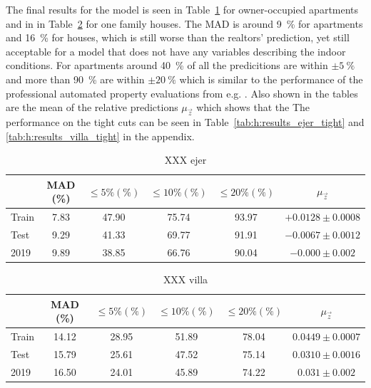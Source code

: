 The final results for the model is seen in Table~\ref{tab:h:results_ejer} for owner-occupied apartments and in in Table~\ref{tab:h:results_villa} for one family houses. The MAD is around \SI{9}{\percent} for apartments and \SI{16}{\percent} for houses, which is still worse than the realtors' prediction, yet still acceptable for a model that does not have any variables describing the indoor conditions. For apartments around \SI{40}{\percent} of all the predicitions are within $\pm \SI{5}{\percent}$ and more than \SI{90}{\percent} are within $\pm \SI{20}{\percent}$ which is similar to the performance of the professional automated property evaluations from e.g. \citet{bolighedBolighedUsikkerhedDatavurderingen}. Also shown in the tables are the mean of the relative predictions $\mu_{\vec{z}}$ which shows that the  The performance on the tight cuts can be seen in Table~\ref{tab:h:results_ejer_tight} and \ref{tab:h:results_villa_tight} in the appendix. 


\begin{table}
  \centerfloat
  \begin{tabular}{@{}lccccc@{}}
    {} &      MAD (\%) & $\leq 5\% (\%)$ &  $\leq 10\% (\%)$ &   $\leq 20\% (\%)$ & $\mu_\vec{z}$              \\
    \midrule
    Train & \num{7.83} & \num{47.90} & \num{75.74} & \num{93.97} &   $+0.0128 \pm 0.0008$ \\
    Test  & \num{9.29} & \num{41.33} & \num{69.77} & \num{91.91} &  $-0.0067 \pm 0.0012$ \\
    2019  & \num{9.89} & \num{38.85} & \num{66.76} & \num{90.04} &  $-0.000 \pm 0.002$ 
    \end{tabular}
  \vspace{\abovecaptionskip}
  \caption{XXX ejer}
  \label{tab:h:results_ejer}
\end{table}


\begin{table}
  \centerfloat
  \begin{tabular}{@{}lccccc@{}}
    {} &      MAD (\%) & $\leq 5\% (\%)$ &  $\leq 10\% (\%)$ &   $\leq 20\% (\%)$ & $\mu_\vec{z}$              \\
    \midrule
    Train & \num{14.12} & \num{28.95} & \num{51.89} & \num{78.04} &  $0.0449 \pm 0.0007$ \\
    Test  & \num{15.79} & \num{25.61} & \num{47.52} & \num{75.14} &  $0.0310 \pm 0.0016$ \\
    2019  & \num{16.50} & \num{24.01} & \num{45.89} & \num{74.22} &  $0.031 \pm 0.002$ 
    \end{tabular}
  \vspace{\abovecaptionskip}
  \caption{XXX villa}
  \label{tab:h:results_villa}
\end{table}


